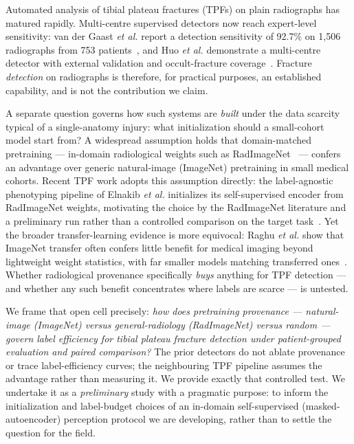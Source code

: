 \documentclass[conference]{IEEEtran}
\begin{document}
Automated analysis of tibial plateau fractures (TPFs) on plain radiographs has
matured rapidly. Multi-centre supervised detectors now reach expert-level
sensitivity: van der Gaast \textit{et al.} report a detection sensitivity of 92.7\%
on 1{,}506 radiographs from 753 patients~\cite{vandergaast25}, and Huo \textit{et
al.} demonstrate a multi-centre detector with external validation and occult-fracture
coverage~\cite{huo25}. Fracture \emph{detection} on radiographs is therefore, for
practical purposes, an established capability, and is not the contribution we claim.

A separate question governs how such systems are \emph{built} under the data scarcity
typical of a single-anatomy injury: what initialization should a small-cohort model
start from? A widespread assumption holds that domain-matched pretraining ---
in-domain radiological weights such as RadImageNet~\cite{mei22radimagenet} --- confers
an advantage over generic natural-image (ImageNet) pretraining in small medical
cohorts. Recent TPF work adopts this assumption directly: the label-agnostic
phenotyping pipeline of Elnakib \textit{et al.} initializes its self-supervised
encoder from RadImageNet weights, motivating the choice by the RadImageNet literature
and a preliminary run rather than a controlled comparison on the target
task~\cite{elnakib26}. Yet the broader transfer-learning evidence is more equivocal:
Raghu \textit{et al.} show that ImageNet transfer often confers little benefit for
medical imaging beyond lightweight weight statistics, with far smaller models
matching transferred ones~\cite{raghu19transfusion}. Whether radiological provenance
specifically \emph{buys} anything for TPF detection --- and whether any such benefit
concentrates where labels are scarce --- is untested.

We frame that open cell precisely: \emph{how does pretraining provenance ---
natural-image (ImageNet) versus general-radiology (RadImageNet) versus random ---
govern label efficiency for tibial plateau fracture detection under patient-grouped
evaluation and paired comparison?} The prior detectors do not ablate provenance or
trace label-efficiency curves; the neighbouring TPF pipeline assumes the advantage
rather than measuring it. We provide exactly that controlled test. We undertake it as
a \emph{preliminary} study with a pragmatic purpose: to inform the initialization and
label-budget choices of an in-domain self-supervised (masked-autoencoder) perception
protocol we are developing, rather than to settle the question for the field.
\end{document}
